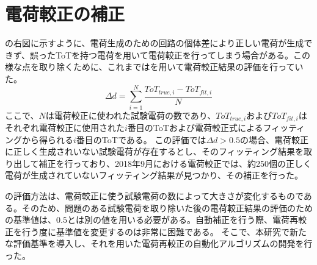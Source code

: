 \section{電荷較正の補正}
\label{sec:calibhosei}
の右図に示すように、電荷生成のための回路の個体差により正しい電荷が生成できず、誤ったToTを持つ電荷を用いて電荷較正を行ってしまう場合がある。この様な点を取り除くために、これまではを用いて電荷較正結果の評価を行っていた。
\begin{equation}
  \label{eq:averagedistance}
  \Delta d = \sum_{i=1}^{N} \frac{ToT_{true, i} - ToT_{fit, i}}{N}
\end{equation}
ここで、$N$は電荷較正に使われた試験電荷の数であり、$ToT_{true, i}$および$ToT_{fit, i}$はそれぞれ電荷較正に使用された$i$番目のToTおよび電荷較正式によるフィッティングから得られる$i$番目のToTである。
この評価では$\Delta d > 0.5$の場合、電荷較正に正しく生成されいない試験電荷が存在するとし、そのフィッティング結果を取り出して補正を行っており、2018年9月における電荷較正では、約250個の正しく電荷が生成されていないフィッティング結果が見つかり、その補正を行った。


の評価方法は、電荷較正に使う試験電荷の数によって大きさが変化するものである。そのため、問題のある試験電荷を取り除いた後の電荷較正結果の評価のための基準値は、$0.5$とは別の値を用いる必要がある。自動補正を行う際、電荷再較正を行う度に基準値を変更するのは非常に困難である。
そこで、本研究で新たな評価基準を導入し、それを用いた電荷再較正の自動化アルゴリズムの開発を行った。


